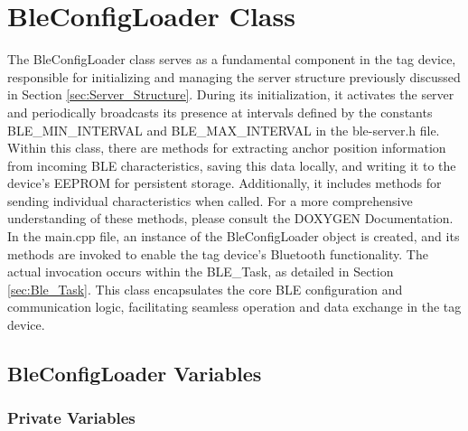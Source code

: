 \section{BleConfigLoader Class}
\label{sec:BleConfigLoader}
The BleConfigLoader class serves as a fundamental component in the tag device, responsible for initializing and managing the server structure previously discussed in Section \ref{sec:Server_Structure}. During its initialization, it activates the server and periodically broadcasts its presence at intervals defined by the constants BLE\_MIN\_INTERVAL and BLE\_MAX\_INTERVAL in the ble-server.h file.
\vspace{4pt}
\newline
Within this class, there are methods for extracting anchor position information from incoming BLE characteristics, saving this data locally, and writing it to the device's EEPROM for persistent storage. Additionally, it includes methods for sending individual characteristics when called. For a more comprehensive understanding of these methods, please consult the DOXYGEN Documentation.
\vspace{4pt}
\newline
In the main.cpp file, an instance of the BleConfigLoader object is created, and its methods are invoked to enable the tag device's Bluetooth functionality. The actual invocation occurs within the BLE\_Task, as detailed in Section \ref{sec:Ble_Task}. This class encapsulates the core BLE configuration and communication logic, facilitating seamless operation and data exchange in the tag device.

\subsection{BleConfigLoader Variables}
\label{sub:BleConfigLoader_Variables}

\subsubsection{Private Variables}

